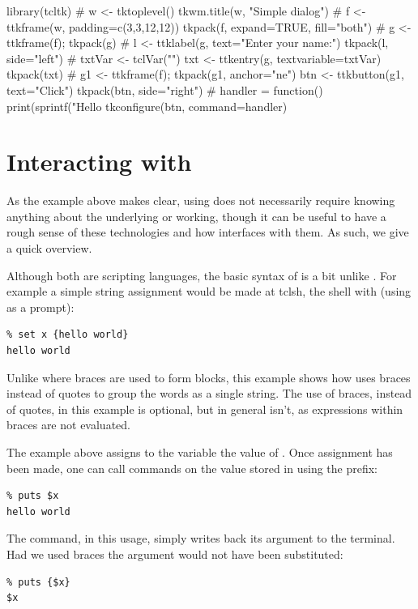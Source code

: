\begin{Schunk}
\begin{Sinput}
 library(tcltk)
 #
 w <- tktoplevel()
 tkwm.title(w, "Simple dialog")
 #
 f <- ttkframe(w, padding=c(3,3,12,12))
 tkpack(f, expand=TRUE, fill="both")
 #
 g <- ttkframe(f); tkpack(g)
 #
 l <- ttklabel(g, text="Enter your name:")
 tkpack(l, side="left")
 #
 txtVar <- tclVar("")
 txt <- ttkentry(g, textvariable=txtVar)
 tkpack(txt)
 #
 g1 <- ttkframe(f); tkpack(g1, anchor="ne")
 btn <- ttkbutton(g1, text="Click")
 tkpack(btn, side="right")
 #
 handler = function() print(sprintf("Hello %
 tkconfigure(btn, command=handler)
\end{Sinput}
\end{Schunk}



\section{Interacting with \TCL}
\label{sec:tcltk:interacting-with-tcl}

As the example above makes clear, using  does not
necessarily require knowing anything about the underlying \Tk{} or
\Tcl{} working, though it can be useful to have a rough sense of these
technologies and how  interfaces with them. As such, we
give a quick overview.


Although both are scripting languages, the basic syntax of \TCL\/ is a
bit unlike \R. For example a simple string assignment would be made at
tclsh, the \TCL\/ shell with (using \code{\%} as a prompt):
\begin{verbatim}
% set x {hello world}
hello world
\end{verbatim}
Unlike \R\/ where braces are used to form blocks, this example shows
how \TCL\/ uses braces instead of quotes to group the words as a
single string. The use of braces, instead of quotes, in this example
is optional, but in general isn't, as expressions within braces are
not evaluated.  

The example above assigns to the variable  the
value of . Once assignment has been made, one can
call commands on the value stored in  using the \code{\$}
prefix:
\begin{verbatim}
% puts $x
hello world
\end{verbatim}
The  command, in this usage, simply writes back its argument to the terminal. Had
we used braces the argument would not have been substituted:
\begin{verbatim}
% puts {$x}
$x
\end{verbatim}

